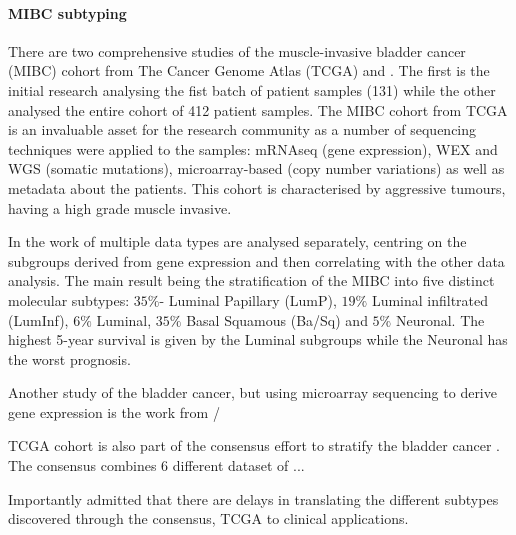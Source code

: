 \paragraph*{MIBC subtyping}

There are two comprehensive studies of the muscle-invasive bladder cancer (MIBC) cohort from The Cancer Genome Atlas (TCGA) \citet{Tcga2014-dr} and \citet{Robertson2017-mg}. The first is the initial research analysing the fist batch of patient samples (131) while the other analysed the entire cohort of 412 patient samples. The MIBC cohort from TCGA is an invaluable asset for the research community as a number of sequencing techniques were applied to the samples: mRNAseq (gene expression), WEX and WGS (somatic mutations), microarray-based (copy number variations) as well as metadata about the patients. This cohort is characterised by aggressive tumours, having a high grade muscle invasive.

In the work of \citet{Robertson2017-mg} multiple data types are analysed separately, centring on the subgroups derived from gene expression and then correlating with the other data analysis. The main result being the stratification of the MIBC into five distinct molecular subtypes: $35\%$- Luminal Papillary (LumP), $19\%$ Luminal infiltrated (LumInf), $6\%$ Luminal, $35\%$ Basal Squamous (Ba/Sq) and $5\%$ Neuronal. The highest 5-year survival is given by the Luminal subgroups while the Neuronal has the worst prognosis. 

Another study of the bladder cancer, but using microarray sequencing to derive gene expression is the work from \citet{Marzouka2018-ge}/

TCGA cohort is also part of the consensus effort to stratify the bladder cancer \citet{Kamoun2020-tj}. The consensus combines 6 different dataset of ... 

Importantly \citet{Kamoun2020-tj} admitted that there are delays in translating the different subtypes discovered through the consensus, TCGA to clinical applications. 


